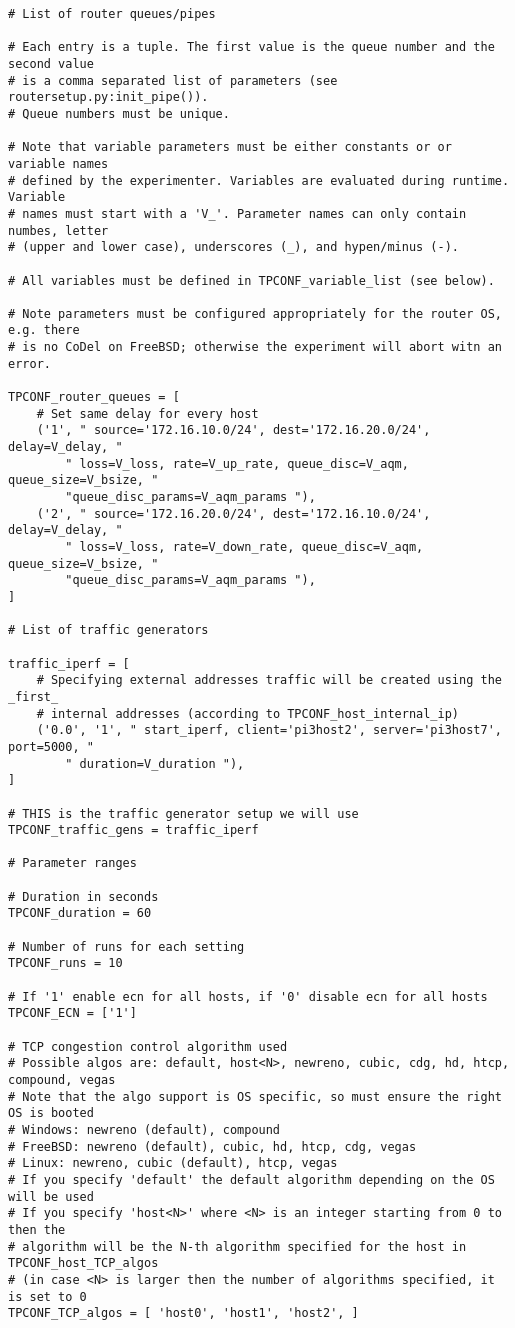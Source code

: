 \begin{code}
\begin{verbatim}
# List of router queues/pipes

# Each entry is a tuple. The first value is the queue number and the second value
# is a comma separated list of parameters (see routersetup.py:init_pipe()).
# Queue numbers must be unique.

# Note that variable parameters must be either constants or or variable names
# defined by the experimenter. Variables are evaluated during runtime. Variable
# names must start with a 'V_'. Parameter names can only contain numbes, letter
# (upper and lower case), underscores (_), and hypen/minus (-).

# All variables must be defined in TPCONF_variable_list (see below).

# Note parameters must be configured appropriately for the router OS, e.g. there
# is no CoDel on FreeBSD; otherwise the experiment will abort witn an error.

TPCONF_router_queues = [
    # Set same delay for every host
    ('1', " source='172.16.10.0/24', dest='172.16.20.0/24', delay=V_delay, "
        " loss=V_loss, rate=V_up_rate, queue_disc=V_aqm, queue_size=V_bsize, "
        "queue_disc_params=V_aqm_params "),
    ('2', " source='172.16.20.0/24', dest='172.16.10.0/24', delay=V_delay, "
        " loss=V_loss, rate=V_down_rate, queue_disc=V_aqm, queue_size=V_bsize, "
        "queue_disc_params=V_aqm_params "),
]

# List of traffic generators

traffic_iperf = [
    # Specifying external addresses traffic will be created using the _first_
    # internal addresses (according to TPCONF_host_internal_ip)
    ('0.0', '1', " start_iperf, client='pi3host2', server='pi3host7', port=5000, "
        " duration=V_duration "),
]

# THIS is the traffic generator setup we will use
TPCONF_traffic_gens = traffic_iperf

# Parameter ranges

# Duration in seconds
TPCONF_duration = 60

# Number of runs for each setting
TPCONF_runs = 10

# If '1' enable ecn for all hosts, if '0' disable ecn for all hosts
TPCONF_ECN = ['1']

# TCP congestion control algorithm used
# Possible algos are: default, host<N>, newreno, cubic, cdg, hd, htcp, compound, vegas
# Note that the algo support is OS specific, so must ensure the right OS is booted
# Windows: newreno (default), compound
# FreeBSD: newreno (default), cubic, hd, htcp, cdg, vegas
# Linux: newreno, cubic (default), htcp, vegas
# If you specify 'default' the default algorithm depending on the OS will be used
# If you specify 'host<N>' where <N> is an integer starting from 0 to then the
# algorithm will be the N-th algorithm specified for the host in TPCONF_host_TCP_algos 
# (in case <N> is larger then the number of algorithms specified, it is set to 0
TPCONF_TCP_algos = [ 'host0', 'host1', 'host2', ]


\end{verbatim}
\end{code}

